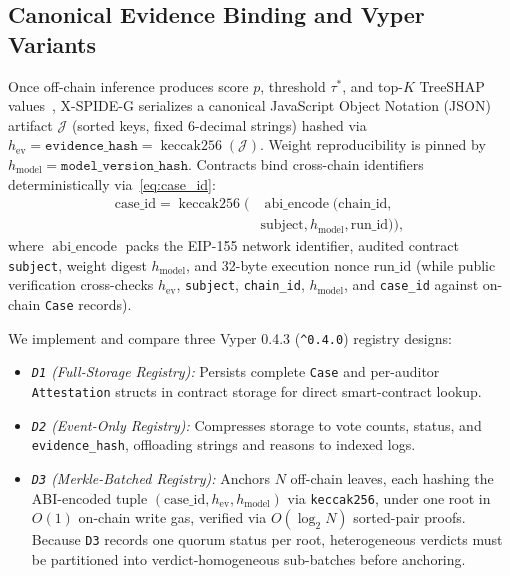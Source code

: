 \documentclass[conference]{IEEEtran}
\begin{document}
\subsection{Canonical Evidence Binding and Vyper Variants}\label{sec:variants}

Once off-chain inference produces score $p$, threshold $\tau^*$, and top-$K$ TreeSHAP values~\cite{lundberg2017shap}, X-SPIDE-G serializes a canonical JavaScript Object Notation (JSON) artifact $\mathcal{J}$ (sorted keys, fixed 6-decimal strings) hashed via $h_{\text{ev}} = \texttt{evidence\_hash} = \operatorname{keccak256}(\mathcal{J})$. Weight reproducibility is pinned by $h_{\text{model}} = \texttt{model\_version\_hash}$. Contracts bind cross-chain identifiers deterministically via~\eqref{eq:case_id}:
\begin{equation}\label{eq:case_id}
\begin{aligned}
\text{case\_id} = \operatorname{keccak256}\bigl(&\operatorname{abi\_encode}(\text{chain\_id},\\
&\text{subject}, h_{\text{model}}, \text{run\_id})\bigr),
\end{aligned}
\end{equation}
where $\operatorname{abi\_encode}$ packs the EIP-155 network identifier, audited contract \texttt{subject}, weight digest $h_{\text{model}}$, and 32-byte execution nonce $\text{run\_id}$ (while public verification cross-checks $h_{\text{ev}}$, \texttt{subject}, \texttt{chain\_id}, $h_{\text{model}}$, and \texttt{case\_id} against on-chain \texttt{Case} records).

We implement and compare three Vyper 0.4.3 (\texttt{\string^0.4.0}) registry designs:
\begin{itemize}
\item \emph{\texttt{D1} (Full-Storage Registry):} Persists complete \texttt{Case} and per-auditor \texttt{Attestation} structs in contract storage for direct smart-contract lookup.
\item \emph{\texttt{D2} (Event-Only Registry):} Compresses storage to vote counts, status, and \texttt{evidence\_hash}, offloading strings and reasons to indexed logs.
\item \emph{\texttt{D3} (Merkle-Batched Registry):} Anchors $N$ off-chain leaves, each hashing the ABI-encoded tuple $(\text{case\_id}, h_{\text{ev}}, h_{\text{model}})$ via \texttt{keccak256}, under one root in $O(1)$ on-chain write gas, verified via $O(\log_2 N)$ sorted-pair proofs. Because \texttt{D3} records one quorum status per root, heterogeneous verdicts must be partitioned into verdict-homogeneous sub-batches before anchoring.
\end{itemize}
\end{document}
